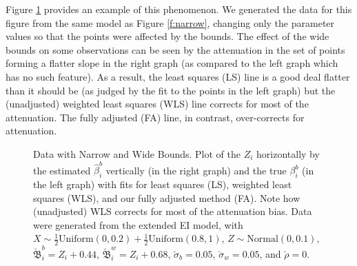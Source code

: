 \documentclass[11pt,titlepage]{article}
\newcommand{\bbeta}{{\mathfrak B}}
\newcommand{\sigmau}{\breve{\sigma}}
\newcommand{\rhou}{\breve{\rho}}
\begin{document}
Figure \ref{f:mixed} provides an example of this phenomenon.  We
generated the data for this figure from the same model as Figure
\ref{f:narrow}, changing only the parameter values so that the points
were affected by the bounds.  The effect of the wide bounds on some
observations can be seen by the attenuation in the set of points
forming a flatter slope in the right graph (as compared to the left
graph which has no such feature).  As a result, the least squares (LS)
line is a good deal flatter than it should be (as judged by the fit to
the points in the left graph) but the (unadjusted) weighted least
squares (WLS) line corrects for most of the attenuation.  The fully
adjusted (FA) line, in contrast, over-corrects for attenuation.
\begin{figure}[t]
  \begin{center}
    \caption{Data with Narrow and Wide Bounds. Plot of the $Z_i$ 
      horizontally by the estimated $\hat\beta_i^b$ vertically (in the
      right graph) and the true $\beta_i^b$ (in the left graph) with
      fits for least squares (LS), weighted least squares (WLS), and
      our fully adjusted method (FA).  Note how (unadjusted) WLS
      corrects for most of the attenuation bias.  Data were generated
      from the extended EI model, with $X \sim
      \frac{1}{2}\textrm{Uniform}(0,0.2) +
      \frac{1}{2}\textrm{Uniform}(0.8,1)$, $Z \sim
      \textrm{Normal}(0,0.1)$, $\breve\bbeta_i^b = Z_i + 0.44$,
      $\breve\bbeta_i^w = Z_i + 0.68$, $\sigmau_b = 0.05$, $\sigmau_w
      = 0.05$, and $\rhou = 0$.}
    \label{f:mixed}
  \end{center}
\end{figure}
\end{document}
